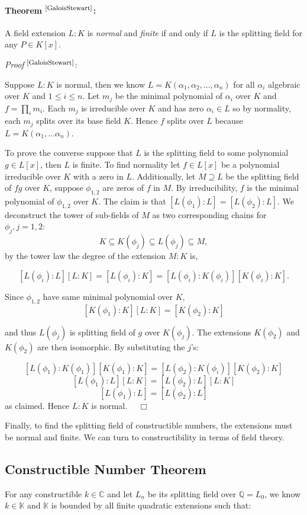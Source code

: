 \documentclass{article}
\begin{document}
 \paragraph{Theorem $^{\textrm{\footnotesize\cite{GaloisStewart}}}$:} A field extension $L: K$ is \textit{normal} and \textit{finite} if and only if $L$ is the splitting field for any $P\in K[x]$.
 \par
\textit{Proof} $^{\textrm{\footnotesize\cite{GaloisStewart}}}$:
\par
Suppose $L:K$ is normal, then we know $L = K(\alpha_1,\alpha_2, ... ,\alpha_n)$ for all $\alpha_i$ algebraic  over $K$ and $1 \leq i \leq n$.  Let $m_j$ be the minimal polynomial of $\alpha_i$ over $K$ and $f=\prod_{i}m_i$. Each $m_j$ is irreducible over $K$ and has zero $\alpha_i\in L$ so by normality, each $m_j$ splits over its base field $K$. Hence $f$ splits over $L$ because $ L = K(\alpha_1,...\alpha_n)$.
\par 
To prove the converse suppose that $L$ is the splitting field to some polynomial $g\in L[x]$, then $L$ is finite. To find normality let $f\in L[x]$ be a polynomial irreducible over $K$ with a zero in $L$. Additionally, let $M\supseteq L$ be the splitting field of $fg$ over $K$, suppose $\phi_{1,2}$ are zeros of $f$ in $M$. By irreducibility, $f$ is the minimal polynomial of $\phi_{1,2}$ over $K$. The claim is that $[L(\phi_1): L]=[L(\phi_2): L]$. We deconstruct the tower of sub-fields of $M$ as two corresponding chains for $\phi_j,j=1,2$:
$$K\subseteq K(\phi_j) \subseteq L(\phi_j) \subseteq M,$$ by the tower law the degree of the extension $M:K$ is,

$$[L(\phi_i): L][L:K] = [L(\phi_i): K] = [L(\phi_i): K(\phi_i)] [K(\phi_i): K].$$ 

Since $\phi_{1,2}$ have same minimal polynomial over $K$,
$$[K(\phi_1): K][L:K] = [K(\phi_2): K]$$

and thus $L(\phi_j)$ is splitting field of $g$ over $K(\phi_j)$. The extensions $K(\phi_2)$ and $K(\phi_2)$ are then isomorphic. By substituting the $j$'s:

$$[L(\phi_1): K(\phi_1)] [K(\phi_1): K] =  [L(\phi_2): K(\phi_i)] [K(\phi_2): K]$$
$$ [L(\phi_1): L][L:K] = [L(\phi_2): L][L:K]$$
$$[L(\phi_1): L] = [L(\phi_2): L]$$ as claimed. Hence $L:K$ is normal. $\quad \Box$ 
\par
Finally, to find the splitting field of constructible numbers, the extensions must be normal and finite. We can turn to constructibility in terms of field theory.

\subsection{Constructible Number Theorem}
For any constructible $k\in\mathbb{C}$ and let $L_n$ be its splitting field over $\mathbb{Q} = L_0$, we know $k\in\mathbb{K}$ and $\mathbb{K}$ is bounded by all finite quadratic extensions such that:
\end{document}
